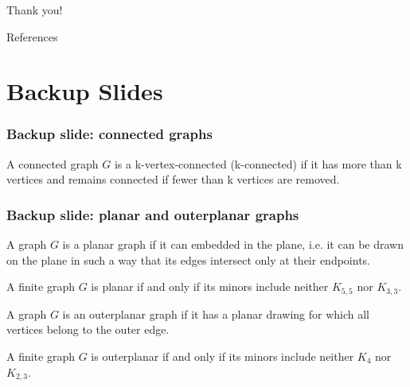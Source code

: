 \documentclass[xetex,mathserif,serif]{beamer}
\begin{document}
\begin{frame}[standout]
  Thank you!
\end{frame}

\begin{frame}[fragile]{References}
\printbibliography
\end{frame}

\appendix

\section{Backup Slides}

\begin{frame}
  \frametitle{Backup slide: connected graphs}

  \begin{definition}
    A connected graph \(G\) is a k-vertex-connected (k-connected) if it has more than k vertices and remains connected if fewer than k vertices are removed.
  \end{definition}
\end{frame}

\begin{frame}
  \frametitle{Backup slide: planar and outerplanar graphs}

  \begin{definition}
    A graph \(G\) is a planar graph if it can embedded in the plane, i.e. it can be drawn on the plane in such a way that its edges intersect only at their endpoints.
  \end{definition}

  \begin{definition}
    A finite graph \(G\) is planar if and only if its minors include neither \(K_{5,5}\) nor \(K_{3, 3}\).
  \end{definition}

  \begin{definition}
    A graph \(G\) is an outerplanar graph if it has a planar drawing for which all vertices belong to the outer edge.
  \end{definition}

  \begin{definition}
    A finite graph \(G\) is outerplanar if and only if its minors include neither \(K_4\) nor \(K_{2, 3}\).
  \end{definition}
\end{frame}
\end{document}
